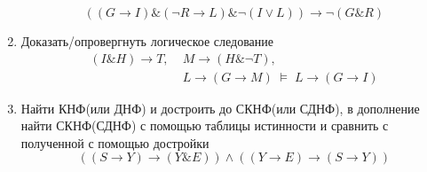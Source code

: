 \documentclass[10pt,a4paper]{article}
\begin{document}
\begin{multicols}{2}
\begin{enumerate}
$$((G\to I)\&(\neg R\to L)\&\neg(I\vee L))\to\neg(G\& R)$$
\item Доказать/опровергнуть логическое следование
\begin{equation*}\begin{split}(I\& H)\to T,\;& M\to(H\&\neg T),\; \\& L\to (G\to M)\;\models\; L\to(G\to I)\end{split}\end{equation*}
\item Найти КНФ(или ДНФ) и достроить до СКНФ(или СДНФ), в дополнение найти СКНФ(СДНФ) с помощью таблицы истинности и сравнить с полученной с помощью достройки
$$((S\to Y)\to(Y\& E))\wedge((Y\to E)\to(S\to Y))$$
\end{enumerate}

\end{multicols}
\end{document}
